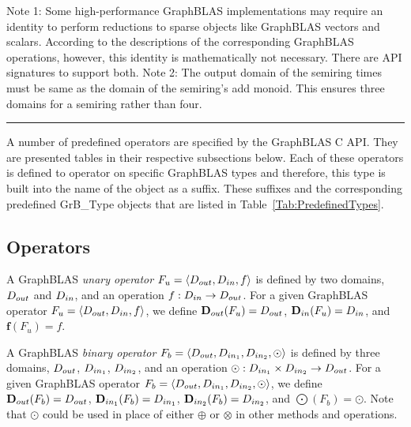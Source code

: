 \begin{table}
\begin{center}
    \end{center}

        {\footnotesize Note 1: Some high-performance GraphBLAS implementations may require 
        an identity to perform reductions to sparse objects like GraphBLAS vectors 
        and scalars. According to the descriptions of the corresponding GraphBLAS operations, 
        however, this identity is mathematically not necessary.  There are API signatures to
        support both.\newline
        Note 2: The output domain of the semiring times must be same as the domain of the 
        semiring's add monoid. This ensures three domains for a semiring rather than four.}

    \hrule
\end{table}


A number of predefined operators are specified by the GraphBLAS C API.  They
are presented tables in their respective subsections below. Each of these 
operators is defined to operator on specific GraphBLAS types and therefore, 
this type is built into the name of the object as a suffix.  These suffixes 
and the corresponding predefined {\sf GrB\_Type} objects that are listed in 
Table~\ref{Tab:PredefinedTypes}.

\subsection{Operators}

A GraphBLAS \emph{unary operator} $F_u = \langle \mbox{$D_{out}$}, \mbox{$D_{in}$}, f\rangle$
is defined by two domains, $\mbox{$D_{out}$}$ and $\mbox{$D_{in}$}$, and an operation
$f: \mbox{$D_{in}$} \rightarrow \mbox{$D_{out}$}$.  For a given GraphBLAS operator
$F_u=\langle \mbox{$D_{out}$}, \mbox{$D_{in}$}, f \rangle$, we define $\mbox{$\mathbf{D}_{out}$}(F_u) = \mbox{$D_{out}$}$, 
$\mbox{$\mathbf{D}_{in}$}(F_u) = \mbox{$D_{in}$}$, and $\mathbf{f}(F_u) = f$.

A GraphBLAS \emph{binary operator} $F_b = \langle \mbox{$D_{out}$}, \mbox{$D_{in_{1}}$}, \mbox{$D_{in_{2}}$}, 
\odot \rangle$
is defined by three domains, $\mbox{$D_{out}$}$, $\mbox{$D_{in_{1}}$}$, $\mbox{$D_{in_{2}}$}$, and an operation
$\odot: \mbox{$D_{in_{1}}$} \times \mbox{$D_{in_{2}}$} \rightarrow \mbox{$D_{out}$}$.  For a given GraphBLAS operator
$F_b=\langle \mbox{$D_{out}$}, \mbox{$D_{in_{1}}$}, \mbox{$D_{in_{2}}$}, \odot \rangle$, we define $\mbox{$\mathbf{D}_{out}$}(F_b) = \mbox{$D_{out}$}$,
$\mbox{$\mathbf{D}_{in_{1}}$}(F_b) = \mbox{$D_{in_{1}}$}$, $\mbox{$\mathbf{D}_{in_{2}}$}(F_b) = \mbox{$D_{in_{2}}$}$, and $\mathbf{\bigodot}(F_b)
= \odot$.  Note that $\odot$ could be used in place of either $\oplus$ or 
$\otimes$ in other methods and operations. 

